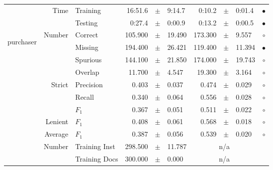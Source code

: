 \begin{longtable}{|r|r|l||rcl|rcl|c|}
\cline{2-10} & \multirow{2}{*}{      Time} &        Training &     16:51.6 &  $\pm$  &      9:14.7 &      0:10.2 &  $\pm$  &      0:01.4 & $\bullet$ \\
\cline{3-10} &                             &         Testing &      0:27.4 &  $\pm$  &      0:00.9 &      0:13.2 &  $\pm$  &      0:00.5 & $\bullet$ \\
\hline
\hline
\multirow{11}{*}{\begin{sideways}purchaser\end{sideways} }
             & \multirow{4}{*}{    Number} &         Correct &     105.900 &  $\pm$  &      19.490 &     173.300 &  $\pm$  &       9.557 & $\circ$ \\
\cline{3-10} &                             &         Missing &     194.400 &  $\pm$  &      26.421 &     119.400 &  $\pm$  &      11.394 & $\bullet$ \\
\cline{3-10} &                             &        Spurious &     144.100 &  $\pm$  &      21.850 &     174.000 &  $\pm$  &      19.743 & $\circ$ \\
\cline{3-10} &                             &         Overlap &      11.700 &  $\pm$  &       4.547 &      19.300 &  $\pm$  &       3.164 & $\circ$ \\
\cline{2-10} & \multirow{3}{*}{    Strict} &       Precision &       0.403 &  $\pm$  &       0.037 &       0.474 &  $\pm$  &       0.029 & $\circ$ \\
\cline{3-10} &                             &          Recall &       0.340 &  $\pm$  &       0.064 &       0.556 &  $\pm$  &       0.028 & $\circ$ \\
\cline{3-10} &                             &           $F_1$ &       0.367 &  $\pm$  &       0.051 &       0.511 &  $\pm$  &       0.022 & $\circ$ \\
\cline{2-10} &                     Lenient &           $F_1$ &       0.408 &  $\pm$  &       0.061 &       0.568 &  $\pm$  &       0.018 & $\circ$ \\
\cline{2-10} &                     Average &           $F_1$ &       0.387 &  $\pm$  &       0.056 &       0.539 &  $\pm$  &       0.020 & $\circ$ \\
\cline{2-10} & \multirow{2}{*}{    Number} &   Training Inst &     298.500 &  $\pm$  &      11.787 &    \multicolumn{3}{c|}{n/a}         &  \\
\cline{3-10} &                             &   Training Docs &     300.000 &  $\pm$  &       0.000 &    \multicolumn{3}{c|}{n/a}         &  \\

\end{longtable}
